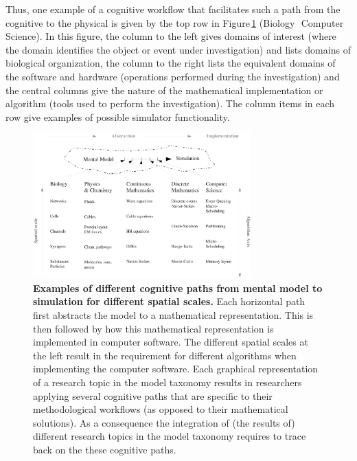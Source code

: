 \documentclass[10pt,letterpaper]{article}
\begin{document}
Thus, one example of a cognitive workflow that facilitates such a path from the cognitive to the physical is given by the top row in Figure\,\ref{fig5} (Biology \textrightarrow\,\,Computer Science).  In this figure, the column to the left gives domains of interest (where the domain identifies the object or event under investigation) and lists domains of biological organization, the column to the right lists the equivalent domains of the software and hardware (operations performed during the investigation) and the central columns give the nature of the mathematical implementation or algorithm (tools used to perform the investigation).  The column items in each row give examples of possible simulator functionality.

\begin{figure}[h!t]
  \begin{center}
    \includegraphics[width=0.75\textwidth]{figures/NS-abstraction-implementation.eps}
  \end{center}
  \caption{ \small{\bf Examples of different cognitive paths from mental model to simulation for different spatial scales.}  Each horizontal path first abstracts the model to a mathematical representation.  This is then followed by how this mathematical representation is implemented in computer software.  The different spatial scales at the left result in the requirement for different algorithms when implementing the computer software.  Each graphical representation of a research topic in the model taxonomy results in researchers applying several cognitive paths that are specific to their methodological workflows (as opposed to their mathematical solutions).  As a consequence the integration of (the results of) different research topics in the model taxonomy requires to trace back on the these cognitive paths.  }
  \label{fig5}
\end{figure}
\end{document}
